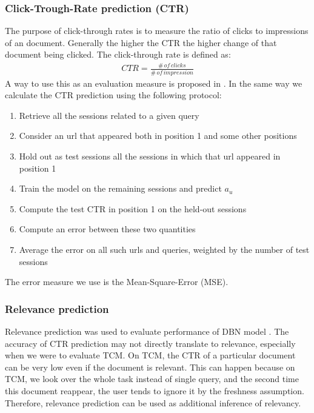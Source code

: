 \subsubsection{Click-Trough-Rate prediction (CTR)}
The purpose of click-through rates is to measure the ratio of clicks to impressions of an document.
Generally the higher the CTR the higher change of that document being clicked.
The click-through rate is defined as:
\begin{align*}
	CTR = \frac{\# \, of \, clicks}{\# \, of \, impression}
\end{align*}
A way to use this as an evaluation measure is proposed in \cite[p. 4]{Chapelle2009}. In the same way we calculate the CTR prediction using the following protocol:
\begin{enumerate}
	\item Retrieve all the sessions related to a given query
	\item Consider an url that appeared both in position 1 and some other positions
	\item Hold out as test sessions all the sessions in which that url appeared in position 1
	\item Train the model on the remaining sessions and predict $a_u$
	\item Compute the test CTR in position 1 on the held-out sessions
	\item Compute an error between these two quantities
	\item  Average the error on all such urls and queries, weighted by the number of test sessions
\end{enumerate}

The error measure we use is the Mean-Square-Error (MSE).

\subsubsection{Relevance prediction}
Relevance prediction was used to evaluate performance of DBN model \cite[p. 6]{Chapelle2009}.
The accuracy of CTR prediction may not directly translate to relevance, especially when we were to evaluate TCM.
On TCM, the CTR of a particular document can be very low even if the document is relevant.
This can happen because on TCM, we look over the whole task instead of single query, and the second time this document reappear, the user tends to ignore it by the freshness assumption. 
Therefore, relevance prediction can be used as additional inference of relevancy.

